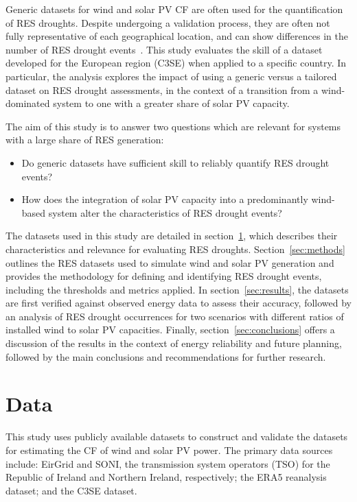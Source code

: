 \documentclass[preprint, 12pt]{elsarticle}
\begin{document}
Generic datasets for wind and solar PV CF are often used for the quantification of RES droughts. Despite undergoing a validation process, they are often not fully representative of each geographical location, and can show differences in the number of RES drought events~\citep{kies2021drought}. This study evaluates the skill of a dataset developed for the European region (C3SE) when applied to a specific country. In particular, the analysis explores the impact of using a generic versus a tailored dataset on RES drought assessments, in the context of a transition from a wind-dominated system to one with a greater share of solar PV capacity.

The aim of this study is to answer two questions which are relevant for systems with a large share of RES generation:
\begin{itemize}
	\item Do generic datasets have sufficient skill to reliably quantify RES drought events?
	\item How does the integration of solar PV capacity into a predominantly wind-based system alter the characteristics of RES drought events?
\end{itemize}

The datasets used in this study are detailed in section~\ref{sec:data}, which describes their characteristics and relevance for evaluating RES droughts. Section~\ref{sec:methods} outlines the RES datasets used to simulate wind and solar PV generation and provides the methodology for defining and identifying RES drought events, including the thresholds and metrics applied. In section~\ref{sec:results}, the datasets are first verified against observed energy data to assess their accuracy, followed by an analysis of RES drought occurrences for two scenarios with different ratios of installed wind to solar PV capacities. Finally, section~\ref{sec:conclusions} offers a discussion of the results in the context of energy reliability and future planning, followed by the main conclusions and recommendations for further research.

\section{Data}
\label{sec:data}

This study uses publicly available datasets to construct and validate the datasets for estimating the CF of wind and solar PV power. The primary data sources include: EirGrid and SONI, the transmission system operators (TSO) for the Republic of Ireland and Northern Ireland, respectively; the ERA5 reanalysis dataset; and the C3SE dataset.
\end{document}
